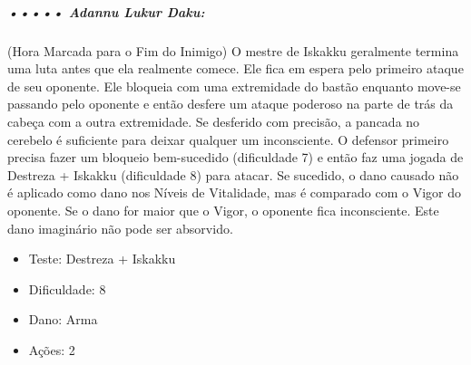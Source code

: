 \subparagraph{\bf ••••• Adannu Lukur Daku:}
(Hora Marcada para o Fim do Inimigo) O mestre de Iskakku geralmente termina uma luta antes que ela realmente comece. Ele fica em espera pelo primeiro ataque de seu oponente. Ele bloqueia com uma extremidade do bastão enquanto move-se passando pelo oponente e então desfere um ataque poderoso na parte de trás da cabeça com a outra extremidade. Se desferido com precisão, a pancada no cerebelo é suficiente para deixar qualquer um inconsciente. O defensor primeiro precisa fazer um bloqueio bem-sucedido (dificuldade 7) e então faz uma jogada de Destreza + Iskakku (dificuldade 8) para atacar. Se sucedido, o dano causado não é aplicado como dano nos Níveis de Vitalidade, mas é comparado com o Vigor do oponente. Se o dano for maior que o Vigor, o oponente fica inconsciente. Este dano imaginário não pode ser absorvido.
\begin{itemize}[noitemsep]
\item Teste: Destreza + Iskakku
\item Dificuldade: 8
\item Dano: Arma
\item Ações: 2
\end{itemize}